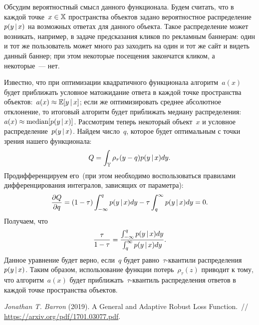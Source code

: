 \documentclass[12pt,fleqn]{article}
\begin{document}
Обсудим вероятностный смысл данного функционала.
Будем считать, что в каждой точке~$x \in \mathbb{X}$ пространства объектов
задано вероятностное распределение~$p(y \mspace{3mu}{|}\mspace{3mu} x)$ на возможных ответах для данного объекта.
Такое распределение может возникать, например, в задаче предсказания кликов по рекламным баннерам:
один и тот же пользователь может много раз заходить на один и тот же сайт и видеть данный баннер;
при этом некоторые посещения закончатся кликом, а некоторые~--- нет.

Известно, что при оптимизации квадратичного функционала алгоритм~$a(x)$
будет приближать условное матожидание ответа в каждой точке пространства
объектов:~$a(x) \approx \mathbb{E} [y \mspace{3mu}{|}\mspace{3mu} x]$;
если же оптимизировать среднее абсолютное отклонение, то итоговый алгоритм
будет приближать медиану распределения:~$a(x) \approx \text{median} [p(y \mspace{3mu}{|}\mspace{3mu} x)]$.
Рассмотрим теперь некоторый объект~$x$ и условное распределение~$p(y \mspace{3mu}{|}\mspace{3mu} x)$.
Найдем  число~$q$, которое будет оптимальным с точки зрения нашего функционала:
\[
    Q = \int_{\mathbb{Y}} \rho_\tau(y - q) p(y \mspace{3mu}{|}\mspace{3mu} x) dy.
\]
Продифференцируем его~(при этом необходимо воспользоваться правилами
дифференцирования интегралов, зависящих от параметра):
\[
    \frac{\partial Q}{\partial q}
    =
    (1 - \tau) \int_{-\infty}^{q} p(y \mspace{3mu}{|}\mspace{3mu} x) dy
    -
    \tau \int_{q}^{\infty} p(y \mspace{3mu}{|}\mspace{3mu} x) dy
    =
    0.
\]
Получаем, что
\[
    \frac{\tau}{1 - \tau}
    =
    \frac{
        \int_{-\infty}^{q} p(y \mspace{3mu}{|}\mspace{3mu} x) dy
    }{
        \int_{q}^{\infty} p(y \mspace{3mu}{|}\mspace{3mu} x) dy
    }.
\]
Данное уравнение будет верно, если~$q$ будет равно~$\tau$-квантили распределения~$p(y \mspace{3mu}{|}\mspace{3mu} x)$.
Таким образом, использование функции потерь~$\rho_\tau(z)$ приводит к тому,
что алгоритм~$a(x)$ будет приближать~$\tau$-квантиль распределения ответов в каждой точке
пространства объектов.


\begin{thebibliography}{1}
    \emph{Jonathan T. Barron} (2019).
    A General and Adaptive Robust Loss Function.~//
    \url{https://arxiv.org/pdf/1701.03077.pdf}.
\end{thebibliography}
\end{document}
